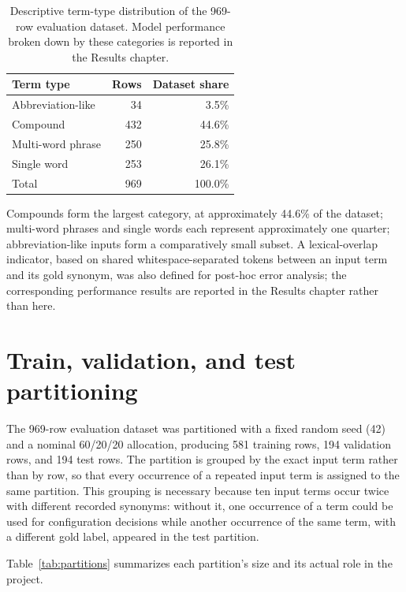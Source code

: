 \begingroup
\footnotesize
\begin{table}[htbp]
\centering
\begin{tabular}{lrr}
\toprule
\textbf{Term type} & \textbf{Rows} & \textbf{Dataset share}\\
\midrule
Abbreviation-like & 34 & 3.5\%\\
Compound & 432 & 44.6\%\\
Multi-word phrase & 250 & 25.8\%\\
Single word & 253 & 26.1\%\\
\midrule
Total & 969 & 100.0\%\\
\bottomrule
\end{tabular}
\caption{Descriptive term-type distribution of the 969-row evaluation dataset. Model performance broken down by these categories is reported in the Results chapter.}
\label{tab:term-types}
\end{table}
\endgroup

Compounds form the largest category, at approximately 44.6\% of the dataset; multi-word phrases and single words each represent approximately one quarter; abbreviation-like inputs form a comparatively small subset. A lexical-overlap indicator, based on shared whitespace-separated tokens between an input term and its gold synonym, was also defined for post-hoc error analysis; the corresponding performance results are reported in the Results chapter rather than here.

\section{Train, validation, and test partitioning}
\label{sec:partitioning}

The 969-row evaluation dataset was partitioned with a fixed random seed (42) and a nominal 60/20/20 allocation, producing 581 training rows, 194 validation rows, and 194 test rows. The partition is grouped by the exact input term rather than by row, so that every occurrence of a repeated input term is assigned to the same partition. This grouping is necessary because ten input terms occur twice with different recorded synonyms: without it, one occurrence of a term could be used for configuration decisions while another occurrence of the same term, with a different gold label, appeared in the test partition.

Table~\ref{tab:partitions} summarizes each partition's size and its actual role in the project.

